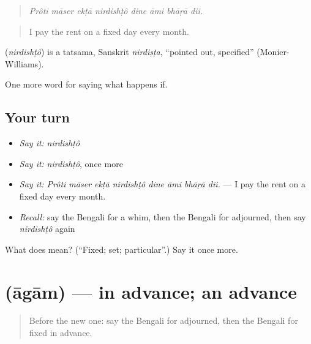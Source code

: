 \begin{quote}
\emph{Prôti māser ekṭā nirdishṭô dine āmi bhāṛā dii.}
\end{quote}

\begin{quote}
I pay the rent on a fixed day every month.
\end{quote}

\begin{cousinweb}
\textbf{} (\emph{nirdishṭô}) is a tatsama, Sanskrit \emph{nirdiṣṭa}, \textquotedblleft{}pointed out, specified\textquotedblright{} (Monier-Williams).
\end{cousinweb}

\begin{grammarlens}[title={What you've built}]
One more word for saying what happens if.
\end{grammarlens}

\subsection*{Your turn}
\begin{itemize}
\raggedright
  \item \emph{Say it:} \emph{nirdishṭô}
  \item \emph{Say it:} \emph{nirdishṭô}, once more
  \item \emph{Say it:} \emph{Prôti māser ekṭā nirdishṭô dine āmi bhāṛā dii.} — I pay the rent on a fixed day every month.
  \item \emph{Recall:} say the Bengali for a whim, then the Bengali for adjourned, then say \emph{nirdishṭô} again
\end{itemize}

\begin{tcolorbox}[breakable,colback=teal!4,colframe=teal!35!black,title={Before you move on}]
What does  mean? (\textquotedblleft{}Fixed; set; particular\textquotedblright{}.) Say it once more.
\end{tcolorbox}
\section[\texorpdfstring{\bn{আগাম} (āgām)}{আগাম (āgām)}]{ (āgām) — in advance; an advance}

\label{lesson:BN-C530-agam}



\begin{quote}
Before the new one: say the Bengali for adjourned, then the Bengali for fixed in advance.
\end{quote}

